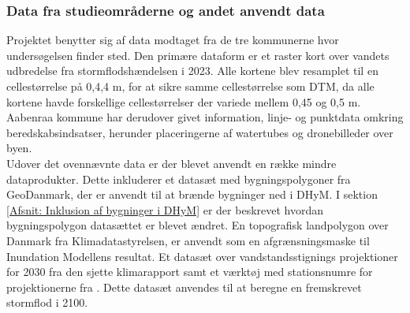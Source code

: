 \subsubsection{Data fra studieområderne og andet anvendt data} \label{Afsnit: Data fra studieområderne og andet anvendt data}
Projektet benytter sig af data modtaget fra de tre kommunerne hvor undersøgelsen finder sted. Den primære dataform er et raster kort over vandets udbredelse fra stormflodshændelsen i 2023. Alle kortene blev resamplet til en cellestørrelse på 0,4,4 m, for at sikre samme cellestørrelse som DTM, da alle kortene havde forskellige cellestørrelser der variede mellem 0,45 og 0,5 m.\\
Aabenraa kommune har derudover givet information, linje- og punktdata omkring beredskabsindsatser, herunder placeringerne af watertubes og dronebilleder over byen.\\ 

Udover det ovennævnte data er der blevet anvendt en række mindre dataprodukter. 
Dette inkluderer et datasæt med bygningspolygoner fra GeoDanmark, der er anvendt til at brænde bygninger ned i DHyM. I sektion \ref{Afsnit: Inklusion af bygninger i DHyM} er der beskrevet hvordan bygningspolygon datasættet er blevet ændret. En topografisk landpolygon over Danmark fra Klimadatastyrelsen, er anvendt som en afgrænsningsmaske til Inundation Modellens resultat. Et datasæt over vandstandsstignings projektioner for 2030 fra den sjette \cite{ipcc_report_AR6, garner_ipcc_2021} klimarapport samt et værktøj med stationsnumre for projektionerne fra \cite{NASA_tool}. Dette datasæt anvendes til at beregne en fremskrevet stormflod i 2100.
